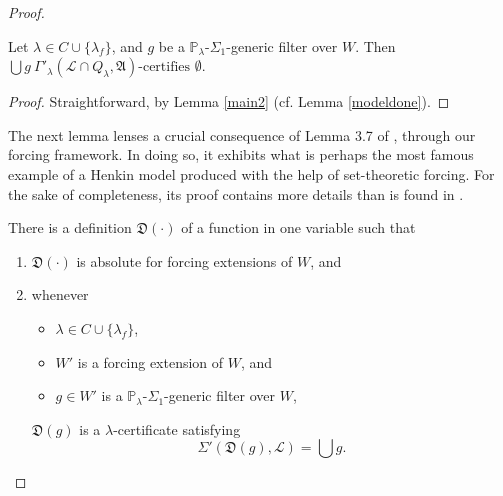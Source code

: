 \documentclass[12pt]{article}
\numberwithin{equation}{section}
\begin{document}
\begin{proof}
\begin{lem}\label{modeldone2}
Let $\lambda \in C \cup \{\lambda_f\}$, and $g$ be a $\mathbb{P}_{\lambda}$-$\Sigma_1$-generic filter over $W$. Then $\bigcup g \ \Gamma'_{\lambda} (\mathcal{L} \cap Q_{\lambda}, \mathfrak{A}) \text{-certifies } \emptyset$.
\end{lem}

\begin{proof}
Straightforward, by Lemma \ref{main2} (cf. Lemma \ref{modeldone}).
\end{proof}

The next lemma lenses a crucial consequence of Lemma 3.7 of \cite{schindler}, through our forcing framework. In doing so, it exhibits what is perhaps the most famous example of a Henkin model produced with the help of set-theoretic forcing. For the sake of completeness, its proof contains more details than is found in \cite{schindler}.

\begin{lem}\label{lem446}
There is a definition $\mathfrak{D}(\cdot)$ of a function in one variable such that
\begin{enumerate}[label=(\arabic*)]
    \item\label{4461} $\mathfrak{D}(\cdot)$ is absolute for forcing extensions of $W$, and
    \item\label{4462} whenever
    \begin{itemize}
        \item $\lambda \in C \cup \{\lambda_f\}$, 
        \item $W'$ is a forcing extension of $W$, and
        \item $g \in W'$ is a $\mathbb{P}_{\lambda}$-$\Sigma_1$-generic filter over $W$,
    \end{itemize}
    $\mathfrak{D}(g)$ is a $\lambda$-certificate satisfying 
    \begin{equation*}
        \Sigma'(\mathfrak{D}(g), \mathcal{L}) = \bigcup g \text{.}
    \end{equation*} 
\end{enumerate} 
\end{lem}


\end{proof}
\end{document}
